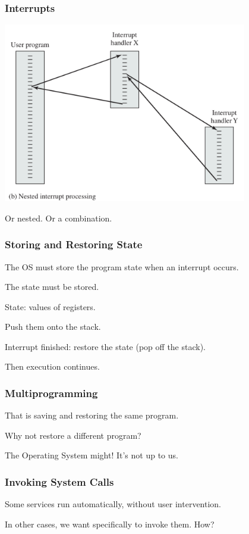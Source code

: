 \begin{frame}
	\frametitle{Interrupts}

	\begin{center}
		\includegraphics[width=0.8\textwidth]{images/interrupts-nest.png}
	\end{center}

	Or nested. Or a combination.

\end{frame}

\begin{frame}
	\frametitle{Storing and Restoring State}

	The OS must store the program state when an interrupt occurs.

	The state must be stored.

	State: values of registers.

	Push them onto the stack.

	Interrupt finished: restore the state (pop off the stack).

	Then execution continues.

\end{frame}

\begin{frame}
	\frametitle{Multiprogramming}
	That is saving and restoring the same program.

	Why not restore a different program?

	The Operating System might! It's not up to us.


\end{frame}

\begin{frame}
	\frametitle{Invoking System Calls}

	Some services run automatically, without user intervention.

	In other cases, we want specifically to invoke them. How?

\end{frame}


